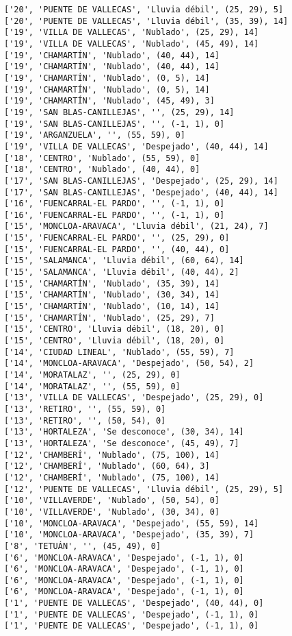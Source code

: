 \documentclass[11pt]{article}
\begin{document}
\begin{Verbatim}[commandchars=\\\{\}]
['20', 'PUENTE DE VALLECAS', 'Lluvia débil', (25, 29), 5]
['20', 'PUENTE DE VALLECAS', 'Lluvia débil', (35, 39), 14]
['19', 'VILLA DE VALLECAS', 'Nublado', (25, 29), 14]
['19', 'VILLA DE VALLECAS', 'Nublado', (45, 49), 14]
['19', 'CHAMARTÍN', 'Nublado', (40, 44), 14]
['19', 'CHAMARTÍN', 'Nublado', (40, 44), 14]
['19', 'CHAMARTÍN', 'Nublado', (0, 5), 14]
['19', 'CHAMARTÍN', 'Nublado', (0, 5), 14]
['19', 'CHAMARTÍN', 'Nublado', (45, 49), 3]
['19', 'SAN BLAS-CANILLEJAS', '', (25, 29), 14]
['19', 'SAN BLAS-CANILLEJAS', '', (-1, 1), 0]
['19', 'ARGANZUELA', '', (55, 59), 0]
['19', 'VILLA DE VALLECAS', 'Despejado', (40, 44), 14]
['18', 'CENTRO', 'Nublado', (55, 59), 0]
['18', 'CENTRO', 'Nublado', (40, 44), 0]
['17', 'SAN BLAS-CANILLEJAS', 'Despejado', (25, 29), 14]
['17', 'SAN BLAS-CANILLEJAS', 'Despejado', (40, 44), 14]
['16', 'FUENCARRAL-EL PARDO', '', (-1, 1), 0]
['16', 'FUENCARRAL-EL PARDO', '', (-1, 1), 0]
['15', 'MONCLOA-ARAVACA', 'Lluvia débil', (21, 24), 7]
['15', 'FUENCARRAL-EL PARDO', '', (25, 29), 0]
['15', 'FUENCARRAL-EL PARDO', '', (40, 44), 0]
['15', 'SALAMANCA', 'Lluvia débil', (60, 64), 14]
['15', 'SALAMANCA', 'Lluvia débil', (40, 44), 2]
['15', 'CHAMARTÍN', 'Nublado', (35, 39), 14]
['15', 'CHAMARTÍN', 'Nublado', (30, 34), 14]
['15', 'CHAMARTÍN', 'Nublado', (10, 14), 14]
['15', 'CHAMARTÍN', 'Nublado', (25, 29), 7]
['15', 'CENTRO', 'Lluvia débil', (18, 20), 0]
['15', 'CENTRO', 'Lluvia débil', (18, 20), 0]
['14', 'CIUDAD LINEAL', 'Nublado', (55, 59), 7]
['14', 'MONCLOA-ARAVACA', 'Despejado', (50, 54), 2]
['14', 'MORATALAZ', '', (25, 29), 0]
['14', 'MORATALAZ', '', (55, 59), 0]
['13', 'VILLA DE VALLECAS', 'Despejado', (25, 29), 0]
['13', 'RETIRO', '', (55, 59), 0]
['13', 'RETIRO', '', (50, 54), 0]
['13', 'HORTALEZA', 'Se desconoce', (30, 34), 14]
['13', 'HORTALEZA', 'Se desconoce', (45, 49), 7]
['12', 'CHAMBERÍ', 'Nublado', (75, 100), 14]
['12', 'CHAMBERÍ', 'Nublado', (60, 64), 3]
['12', 'CHAMBERÍ', 'Nublado', (75, 100), 14]
['12', 'PUENTE DE VALLECAS', 'Lluvia débil', (25, 29), 5]
['10', 'VILLAVERDE', 'Nublado', (50, 54), 0]
['10', 'VILLAVERDE', 'Nublado', (30, 34), 0]
['10', 'MONCLOA-ARAVACA', 'Despejado', (55, 59), 14]
['10', 'MONCLOA-ARAVACA', 'Despejado', (35, 39), 7]
['8', 'TETUÁN', '', (45, 49), 0]
['6', 'MONCLOA-ARAVACA', 'Despejado', (-1, 1), 0]
['6', 'MONCLOA-ARAVACA', 'Despejado', (-1, 1), 0]
['6', 'MONCLOA-ARAVACA', 'Despejado', (-1, 1), 0]
['6', 'MONCLOA-ARAVACA', 'Despejado', (-1, 1), 0]
['1', 'PUENTE DE VALLECAS', 'Despejado', (40, 44), 0]
['1', 'PUENTE DE VALLECAS', 'Despejado', (-1, 1), 0]
['1', 'PUENTE DE VALLECAS', 'Despejado', (-1, 1), 0]

\end{Verbatim}
\end{document}
